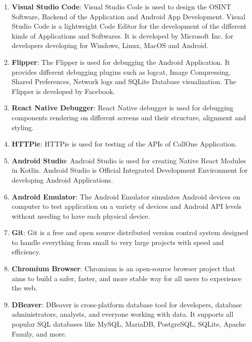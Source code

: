 \begin{enumerate}[label=\roman*.]
  \item \textbf{Visual Studio Code}: Visual Studio Code is used to design the OSINT Software, Backend of the Application and Android App Development. Visual Studio Code is a lightweight Code Editor for the development of the different kinds of Applications and Softwares. It is developed by Microsoft Inc. for developers developing for Windows, Linux, MacOS and Android. \cite{VSCode}
  
  \item \textbf{Flipper}: The Flipper is used for debugging the Android Application. It provides different debugging plugins such as logcat, Image Compressing, Shared Preferences, Network logs and SQLite Database visualization. The Flipper is developed by Facebook. \cite{FLP}
  
  \item \textbf{React Native Debugger}:  React Native debugger is used for debugging components rendering on different screens and their structure, alignment and styling. \cite{RDT}
  
  \item \textbf{HTTPie}:   HTTPie is used for testing of the APIs of CallOne Application. \cite{Httpie}
  
  \item \textbf{Android Studio}: Android Studio is used for creating Native React Modules in Kotlin. Android Studio is Official Integrated Development Environment for developing Android Applications. \cite{Android Studio}
  
  \item \textbf{Android Emulator}: The Android Emulator simulates Android devices on computer to test application on a variety of devices and Android API levels without needing to have each physical device. \cite{Android Studio}
  
  \item \textbf{Git}: Git is a free and open source distributed version control system designed to handle everything from small to very large projects with speed and efficiency. \cite{Git}
  
  \item \textbf{Chromium Browser}: Chromium is an open-source browser project that aims to build a safer, faster, and more stable way for all users to experience the web. \cite{Chromium}

  \item \textbf{DBeaver}: DBeaver is cross-platform database tool for developers, database administrators, analysts, and everyone working with data. It supports all popular SQL databases like MySQL, MariaDB, PostgreSQL, SQLite, Apache Family, and more. \cite{DBeaver}


\end{enumerate}
